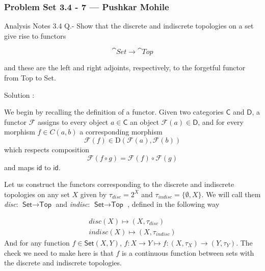 
\begin{frame}
    \frametitle{Problem Set 3.4 - 7 --- Pushkar Mohile}
    Analysis Notes 3.4 Q.- Show that the discrete and indiscrete topologies on a
    set give rise to functors

\begin{equation}
    \cat{Set}\to \cat{Top}
\end{equation}    
    
    and these are the left and right adjoints, respectively, to the forgetful
    functor from Top to Set. 
\end{frame}
\begin{frame}
    
Solution : 

We begin by recalling the definition of a functor. Given two categories
\(\textsf{C}\) and \(\textsf{D}\), a functor \(\mathcal{F} \) assigns to every
object \(a \in \textsf{C}\) an object \(\mathcal{F}(a)\in\textsf{D}\), and for
every morphism \(f \in C(a,b)\) a corresponding morphism 
\begin{equation}
\mathcal{F}(f) \in \text{D}(\mathcal{F}(a), \mathcal{F}(b) )
\end{equation}
which respects composition 
\begin{equation}
    \mathcal{F}(f\circ g) = \mathcal{F}(f) \circ \mathcal{F}(g)
\end{equation}
    and maps \(\textsf{id} \text{ to } \textsf{id}\).
\end{frame}

\begin{frame}
    
Let us construct the functors corresponding to the discrete and indiscrete
topologies on any set \(X\) given by \(\tau_{disc} = 2^X\) and \(\tau_{indisc} =
\{\emptyset,X \}\). We will call them \textit{disc}: \(\textsf{Set} \to
\textsf{Top}\) and \textit{indisc}: \(\textsf{Set}\to \textsf{Top}\) , defined
in the following way 

\begin{gather*}
    \textit{disc}(X) \mapsto (X, \tau_{disc}) \\
    \textit{indisc}(X) \mapsto (X,\tau_{indisc}) 
\end{gather*}
And for any function \(f \in \textsf{Set}(X,Y)\), \(f:X\to Y\mapsto f:(X,
\tau_X)\to(Y,\tau_Y)\). 
The check we need to make here is that \(f\) is a continuous function between
sets with the discrete and indiscrete topologies. 
\end{frame}


